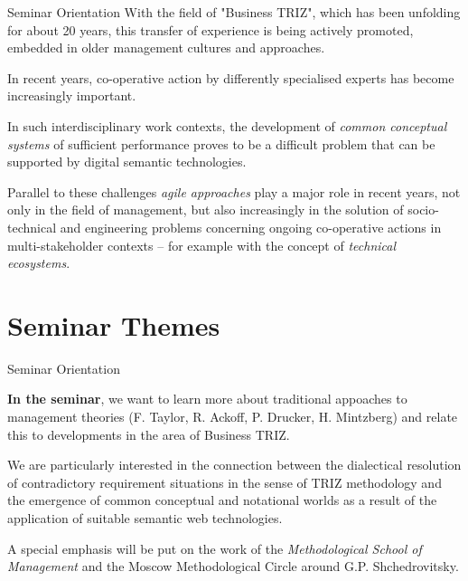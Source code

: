 \documentclass{beamer}
\begin{document}
\begin{frame}{Seminar Orientation}\small
With the field of "Business TRIZ", which has been unfolding for about 20
years, this transfer of experience is being actively promoted, embedded in
older management cultures and approaches.

In recent years, co-operative action by differently specialised experts has
become increasingly important.

In such interdisciplinary work contexts, the development of \emph{common
  conceptual systems} of sufficient performance proves to be a difficult
problem that can be supported by digital semantic technologies.

Parallel to these challenges \emph{agile approaches} play a major role in
recent years, not only in the field of management, but also increasingly in
the solution of socio-technical and engineering problems concerning ongoing
co-operative actions in multi-stakeholder contexts -- for example with the
concept of \emph{technical ecosystems}.
\end{frame}

\section{Seminar Themes}
\begin{frame}{Seminar Orientation}

\textbf{In the seminar}, we want to learn more about traditional appoaches to
management theories (F. Taylor, R. Ackoff, P. Drucker, H. Mintzberg) and
relate this to developments in the area of Business TRIZ.

We are particularly interested in the connection between the dialectical
resolution of contradictory requirement situations in the sense of TRIZ
methodology and the emergence of common conceptual and notational worlds as a
result of the application of suitable semantic web technologies.

A special emphasis will be put on the work of the \emph{Methodological School
  of Management} and the Moscow Methodological Circle around
G.P. Shchedrovitsky.
\end{frame}
\end{document}
